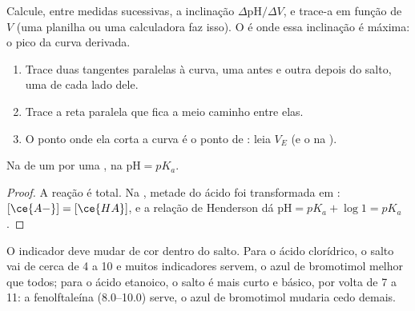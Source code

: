 \begin{method}\label{met:g12:ph-conductivity-titrations:derivative}
Calcule, entre medidas sucessivas, a inclinação
$\Delta\mathrm{pH}/\Delta V$, e trace-a em função de $V$ (uma planilha
ou uma calculadora faz isso). O  é onde essa
inclinação é máxima: o pico da curva derivada.
\end{method}

\begin{method}\label{met:g12:ph-conductivity-titrations:tangent}
\begin{enumerate}
  \item Trace duas tangentes paralelas à curva, uma antes e outra depois
        do salto, uma de cada lado dele.
  \item Trace a reta paralela que fica a meio caminho entre elas.
  \item O ponto onde ela corta a curva é o ponto de : leia
        $V_E$ (e o  na ).
\end{enumerate}
\end{method}

\begin{proposition}[Na semiequivalência, $\mathrm{pH} = pK_a$]\label{prop:g12:ph-conductivity-titrations:half}
Na  de um   por uma , na
 $\mathrm{pH} = pK_a$.
\end{proposition}

\begin{proof}
A reação  é total. Na , metade
do ácido foi transformada em : $[\ce{A-}] = [\ce{HA}]$, e a
relação de Henderson dá $\mathrm{pH} = pK_a + \log 1 = pK_a$.
\end{proof}

\begin{remark}\label{rem:g12:ph-conductivity-titrations:indicator}
O indicador deve mudar de cor dentro do salto. Para o ácido clorídrico,
o salto vai de cerca de  4 a 10 e muitos indicadores servem, o azul de
bromotimol melhor que todos; para o ácido etanoico, o salto é mais curto
e básico, por volta de 7 a 11: a fenolftaleína (8.0--10.0) serve, o azul
de bromotimol mudaria cedo demais.
\end{remark}

